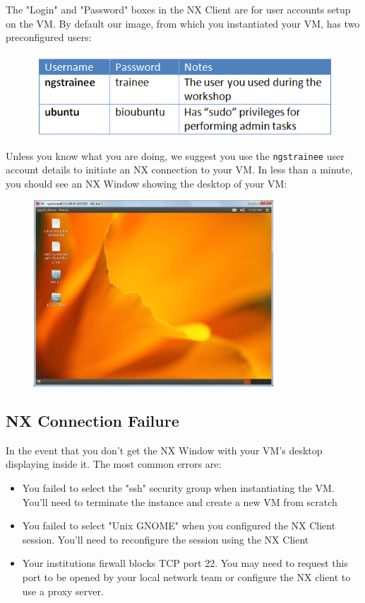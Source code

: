 The "Login" and "Password" boxes in the NX Client are for user accounts setup on
the VM. By default our image, from which you instantiated your VM, has two
preconfigured users:
\begin{figure}[H]
  \centering
  \includegraphics[scale=0.5]{post-workshop/nx_client/usernames_passwords.png}
  \label{fig:nx_usernames_passwords}
\end{figure}

Unless you know what you are doing, we suggest you use the \texttt{ngstrainee}
user account details to initiate an NX connection to your VM. In less than a
minute, you should see an NX Window showing the desktop of your VM:
\begin{figure}[H]
  \centering
  \includegraphics[width=0.8\textwidth]{post-workshop/nx_client/connected.png}
  \label{fig:nx_connected}
\end{figure}

\subsection{NX Connection Failure}
In the event that you don't get the NX Window with your VM's desktop displaying
inside it. The most common errors are:
\begin{itemize}
\item You failed to select the "ssh" security group when instantiating the VM.
You'll need to terminate the instance and create a new VM from scratch
\item You failed to select "Unix GNOME" when you configured the NX Client
session. You'll need to reconfigure the session using the NX Client
\item Your institutions firwall blocks TCP port 22. You may need to request this
port to be opened by your local network team or configure the NX client to use a
proxy server.
\end{itemize}


